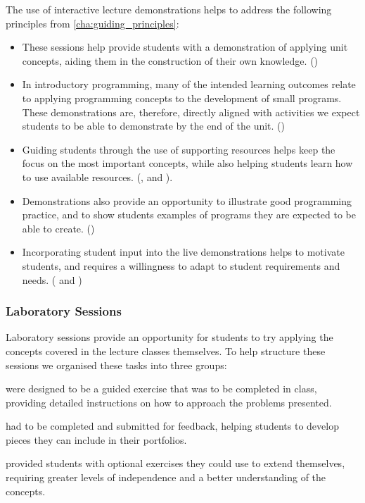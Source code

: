 The use of interactive lecture demonstrations helps to address the following principles from \cref{cha:guiding_principles}:

\begin{itemize}[noitemsep,nolistsep]
	\item These sessions help provide students with a demonstration of applying unit concepts, aiding them in the construction of their own knowledge. ()
	\item In introductory programming, many of the intended learning outcomes relate to applying programming concepts to the development of small programs. These demonstrations are, therefore, directly aligned with activities we expect students to be able to demonstrate by the end of the unit.  ()
	\item Guiding students through the use of supporting resources helps keep the focus on the most important concepts, while also helping students learn how to use available resources. (,  and ).
	\item Demonstrations also provide an opportunity to illustrate good programming practice, and to show students examples of programs they are expected to be able to create. ()
	\item Incorporating student input into the live demonstrations helps to motivate students, and requires a willingness to adapt to student requirements and needs. ( and )
\end{itemize}



\clearpage
\subsubsection{Laboratory Sessions} %
\label{ssub:laboratory_sessions}

Laboratory sessions provide an opportunity for students to try applying the concepts covered in the lecture classes themselves. To help structure these sessions we organised these tasks into three groups: 

\begin{description}
	\item [Laboratory tasks] were designed to be a guided exercise that was to be completed in class, providing detailed instructions on how to approach the problems presented.
	\item [Core tasks] had to be completed and submitted for feedback, helping students to develop pieces they can include in their portfolios.
	\item [Extension tasks] provided students with optional exercises they could use to extend themselves, requiring greater levels of independence and a better understanding of the concepts.
\end{description}

